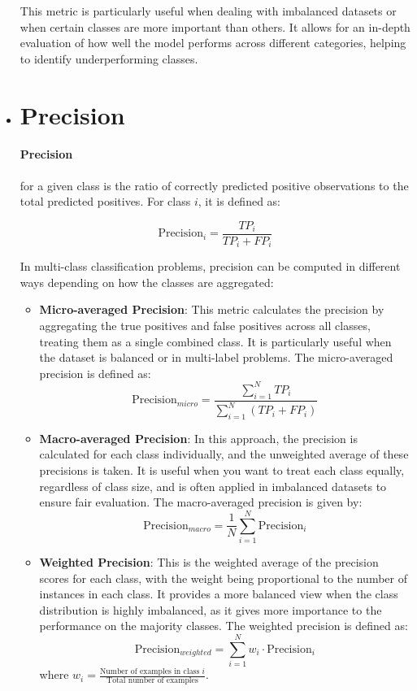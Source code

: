 \begin{itemize}
This metric is particularly useful when dealing with imbalanced datasets or when certain classes are more important than others. It allows for an in-depth evaluation of how well the model performs across different categories, helping to identify underperforming classes.

\item \section{Precision}
\label{subsubsec:precision}

\paragraph{Precision} for a given class is the ratio of correctly predicted positive observations to the total predicted positives. For class $i$, it is defined as:

\[
    \text{Precision}_i = \frac{TP_i}{TP_i + FP_i}
    \label{eq:precision}
\]

In multi-class classification problems, precision can be computed in different ways depending on how the classes are aggregated:

\begin{itemize}
    \item \textbf{Micro-averaged Precision}: This metric calculates the precision by aggregating the true positives and false positives across all classes, treating them as a single combined class. It is particularly useful when the dataset is balanced or in multi-label problems. The micro-averaged precision is defined as:
    \[
        \text{Precision}_{micro} = \frac{\sum_{i=1}^{N} TP_i}{\sum_{i=1}^{N} (TP_i + FP_i)}
    \]

    \item \textbf{Macro-averaged Precision}: In this approach, the precision is calculated for each class individually, and the unweighted average of these precisions is taken. It is useful when you want to treat each class equally, regardless of class size, and is often applied in imbalanced datasets to ensure fair evaluation. The macro-averaged precision is given by:
    \[
        \text{Precision}_{macro} = \frac{1}{N} \sum_{i=1}^{N} \text{Precision}_i
    \]

    \item \textbf{Weighted Precision}: This is the weighted average of the precision scores for each class, with the weight being proportional to the number of instances in each class. It provides a more balanced view when the class distribution is highly imbalanced, as it gives more importance to the performance on the majority classes. The weighted precision is defined as:
    \[
        \text{Precision}_{weighted} = \sum_{i=1}^{N} w_i \cdot \text{Precision}_i
    \]
    where $w_i = \frac{\text{Number of examples in class } i}{\text{Total number of examples}}$.
\end{itemize}


\end{itemize}
